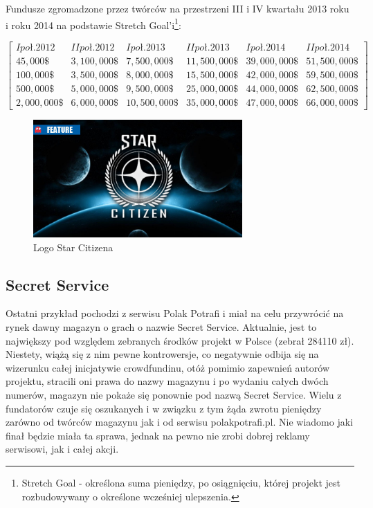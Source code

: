 \documentclass[12pt, a4paper]{article}
\begin{document}
Fundusze zgromadzone przez twórców na przestrzeni III i IV kwartału 2013 roku i roku 2014 na podstawie Stretch Goal'i\footnote{Stretch Goal - określona suma pieniędzy, po osiągnięciu, której projekt jest rozbudowywany o określone wcześniej ulepszenia.}:

\begin{displaymath}
\left[\begin{array}{cccccc}I poł. 2012&II poł. 2012&I poł. 2013&II poł. 2013&I poł. 2014&II poł.2014\\45,000\$&3,100,000\$&7,500,000\$&11,500,000\$&39,000,000\$&51,500,000\$\\100,000\$&3,500,000\$&8,000,000\$&15,500,000\$&42,000,000\$&59,500,000\$\\500,000\$&5,000,000\$&9,500,000\$&25,000,000\$&44,000,000\$&62,500,000\$\\2,000,000\$&6,000,000\$&10,500,000\$&35,000,000\$&47,000,000\$&66,000,000\$\end{array}\right]
\end{displaymath}

\begin{figure}[ht]
\centering
\includegraphics[width=8cm]{sc}
\caption{Logo Star Citizena}
\label{fig:obrazek k}
\end{figure}

\subsection{Secret Service}
\label{sec:ss}

Ostatni przykład pochodzi z serwisu Polak Potrafi i miał na celu przywrócić na rynek dawny magazyn o grach o nazwie Secret Service. Aktualnie, jest to największy pod względem zebranych środków projekt w Polsce (zebrał 284110 zł). Niestety, wiążą się z nim pewne kontrowersje, co negatywnie odbija się na wizerunku całej inicjatywie crowdfundinu, otóż pomimio zapewnień autorów projektu, stracili oni prawa do nazwy magazynu i po wydaniu całych dwóch numerów, magazyn nie pokaże się ponownie pod nazwą Secret Service. Wielu z fundatorów czuje się oszukanych i w związku z tym żąda zwrotu pieniędzy zarówno od twórców magazynu jak i od serwisu polakpotrafi.pl. Nie wiadomo jaki finał będzie miała ta sprawa, jednak na pewno nie zrobi dobrej reklamy serwisowi, jak i całej akcji.
\end{document}
